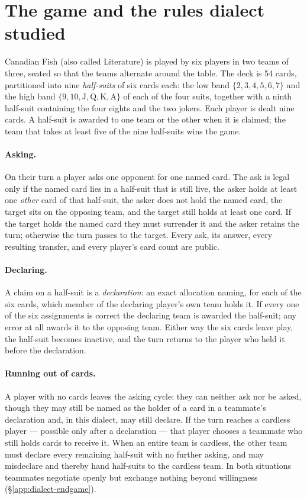 \section{The game and the rules dialect studied}
\label{sec:rules}

Canadian Fish (also called Literature) is played by six players in two teams of
three, seated so that the teams alternate around the table. The deck is 54
cards, partitioned into nine \emph{half-suits} of six cards each: the low band
$\{2,3,4,5,6,7\}$ and the high band $\{9,10,\mathrm{J},\mathrm{Q},\mathrm{K},\mathrm{A}\}$
of each of the four suits, together with a ninth half-suit containing the four
eights and the two jokers. Each player is dealt nine cards. A half-suit is
awarded to one team or the other when it is claimed; the team that takes at
least five of the nine half-suits wins the game.

\paragraph{Asking.} On their turn a player asks one opponent for one named card.
The ask is legal only if the named card lies in a half-suit that is still live,
the asker holds at least one \emph{other} card of that half-suit, the asker does
not hold the named card, the target sits on the opposing team, and the target
still holds at least one card. If the target holds the named card they must
surrender it and the asker retains the turn; otherwise the turn passes to the
target. Every ask, its answer, every resulting transfer, and every player's card
count are public.

\paragraph{Declaring.} A claim on a half-suit is a \emph{declaration}: an exact
allocation naming, for each of the six cards, which member of the declaring
player's own team holds it. If every one of the six assignments is correct the
declaring team is awarded the half-suit; any error at all awards it to the
opposing team. Either way the six cards leave play, the half-suit becomes
inactive, and the turn returns to the player who held it before the
declaration.

\paragraph{Running out of cards.} A player with no cards leaves the asking
cycle: they can neither ask nor be asked, though they may still be named as the
holder of a card in a teammate's declaration and, in this dialect, may still
declare. If the turn reaches a cardless player --- possible only after a
declaration --- that player chooses a teammate who still holds cards to receive
it. When an entire team is cardless, the other team must declare every remaining
half-suit with no further asking, and may misdeclare and thereby hand half-suits
to the cardless team. In both situations teammates negotiate openly but exchange
nothing beyond willingness (\S\ref{app:dialect-endgame}).


